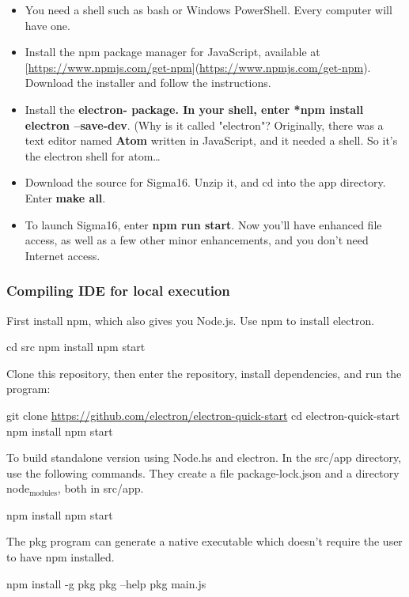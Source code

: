 \documentclass[11pt]{article}
\begin{document}
\begin{itemize}
\item You need a shell such as bash or Windows PowerShell.  Every
computer will have one.

\item Install the npm package manager for JavaScript, available at
[\url{https://www.npmjs.com/get-npm}](\url{https://www.npmjs.com/get-npm}).
Download the installer and follow the instructions.

\item Install the \textbf{electron- package.  In your shell, enter *npm install
electron --save-dev}.  (Why is it called "electron"?  Originally,
there was a text editor named \textbf{Atom} written in JavaScript, and it
needed a shell.  So it's the electron shell for atom\ldots{}

\item Download the source for Sigma16.  Unzip it, and cd into the app
directory.  Enter \textbf{make all}.

\item To launch Sigma16, enter \textbf{npm run start}.  Now you'll have
enhanced file access, as well as a few other minor enhancements,
and you don't need Internet access.
\end{itemize}

\subsubsection*{Compiling IDE for local execution}
\label{sec:orgb5db894}

First install npm, which also gives you Node.js.  Use npm to install
electron.

cd src
npm install
npm start

Clone this repository, then enter the repository, install
dependencies, and run the program:

git clone \url{https://github.com/electron/electron-quick-start}
cd electron-quick-start
npm install
npm start


To build standalone version using Node.hs and electron.  In the
src/app directory, use the following commands.  They create a file
package-lock.json and a directory node\(_{\text{modules}}\), both in src/app.

npm install
npm start

The pkg program can generate a native executable which doesn't require
the user to have npm installed.

npm install -g pkg 
    pkg --help
    pkg main.js
\end{document}
